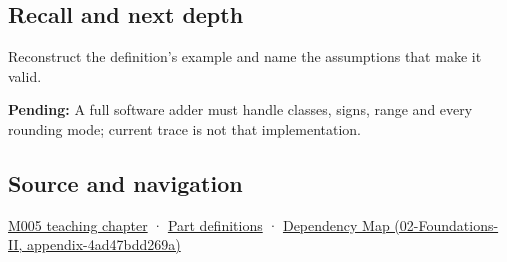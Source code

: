 \subsection{Recall and next depth}\label{appendix-a1b1b4580dfd-recall-and-next-depth}

Reconstruct the definition's example and name the assumptions that make it valid.

\textbf{Pending:} A full software adder must handle classes, signs, range and every rounding mode; current trace is not that implementation.

\subsection{Source and navigation}\label{appendix-a1b1b4580dfd-source-and-navigation}

\hyperref[01-foundations-i-ch001-when-arithmetic-meets-uncertainty]{M005 teaching chapter} · \hyperref[appendix-fd090d982a15-m005---parts-77-88]{Part definitions} · \href{../02-Foundations-II/main.pdf\#nameddest=appendix-4ad47bdd269a}{Dependency Map (02-Foundations-II, appendix-4ad47bdd269a)}
